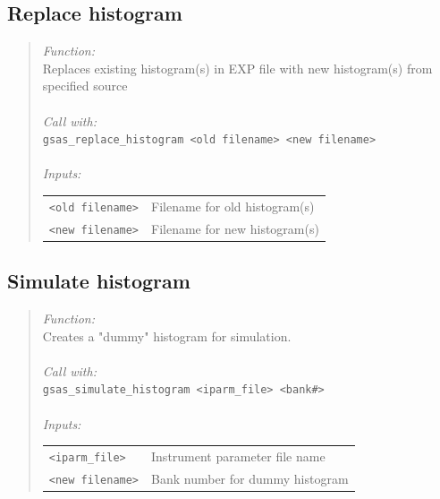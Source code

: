 \documentclass{article}
\begin{document}
\subsection{Replace histogram}
\begin{quote}
\textit{Function:} \\
Replaces existing histogram(s) in EXP file with new histogram(s) from specified source \\ \\
\textit{Call with:} \\
\texttt{gsas\_replace\_histogram <old filename> <new filename>} \\ \\
\textit{Inputs:}\\
\begin{tabular}[t]{l l}
\texttt{<old filename>} &  Filename for old histogram(s) \\
\texttt{<new filename>} &  Filename for new histogram(s) \\ 
\end{tabular}
\end{quote}

\subsection{Simulate histogram}
\begin{quote}
\textit{Function:} \\
Creates a "dummy" histogram for simulation. \\ \\
\textit{Call with:} \\
\texttt{gsas\_simulate\_histogram <iparm\_file> <bank\#>} \\ \\
\textit{Inputs:}\\
\begin{tabular}[t]{l l}
\texttt{<iparm\_file>} &  Instrument parameter file name \\
\texttt{<new filename>} &  Bank number for dummy histogram \\ 
\end{tabular}
\end{quote}

\end{document}
